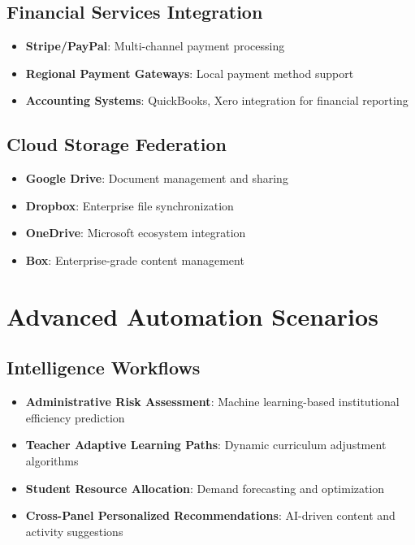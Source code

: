 \subsection{Financial Services Integration}

\begin{itemize}
    \item \textbf{Stripe/PayPal}: Multi-channel payment processing
    \item \textbf{Regional Payment Gateways}: Local payment method support
    \item \textbf{Accounting Systems}: QuickBooks, Xero integration for financial reporting
\end{itemize}

\subsection{Cloud Storage Federation}

\begin{itemize}
    \item \textbf{Google Drive}: Document management and sharing
    \item \textbf{Dropbox}: Enterprise file synchronization
    \item \textbf{OneDrive}: Microsoft ecosystem integration
    \item \textbf{Box}: Enterprise-grade content management
\end{itemize}

\section{Advanced Automation Scenarios}

\subsection{Intelligence Workflows}

\begin{itemize}
    \item \textbf{Administrative Risk Assessment}: Machine learning-based institutional efficiency prediction
    \item \textbf{Teacher Adaptive Learning Paths}: Dynamic curriculum adjustment algorithms
    \item \textbf{Student Resource Allocation}: Demand forecasting and optimization
    \item \textbf{Cross-Panel Personalized Recommendations}: AI-driven content and activity suggestions
\end{itemize}

